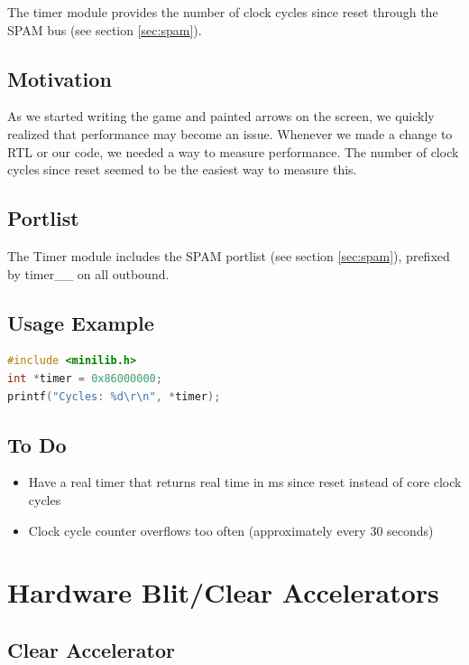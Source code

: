 \documentclass[10pt]{report}
\begin{document}
\label{sec:timer}

The timer module provides the number of clock cycles since reset through the
SPAM bus (see section \ref{sec:spam}).

\subsection{Motivation}

As we started writing the game and painted arrows on the screen, we quickly
realized that performance may become an issue. Whenever we made a change to
RTL or our code, we needed a way to measure performance. The number of clock
cycles since reset seemed to be the easiest way to measure this.

\subsection{Portlist}

The Timer module includes the SPAM portlist (see section \ref{sec:spam}),
prefixed by timer\_\_ on all outbound.

\subsection{Usage Example}
\begin{lstlisting}[basicstyle=\footnotesize,language=C]
#include <minilib.h>
int *timer = 0x86000000;
printf("Cycles: %d\r\n", *timer);
\end{lstlisting}

\subsection{To Do}

\begin{itemize}
\item{Have a real timer that returns real time in ms since reset instead of
core clock cycles}
\item{Clock cycle counter overflows too often (approximately every 30
seconds)}
\end{itemize}

\section{Hardware Blit/Clear Accelerators}
\label{sec:accel}

\subsection{Clear Accelerator}
\end{document}

